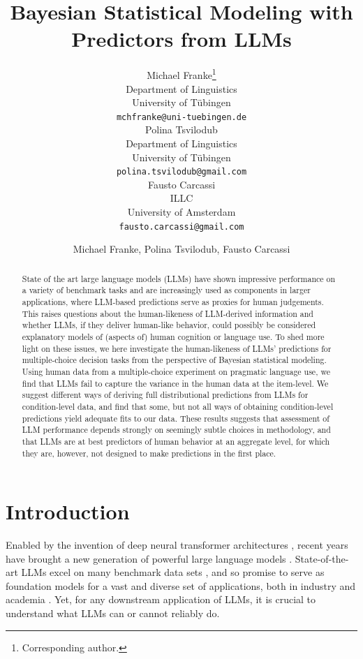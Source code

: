 \documentclass[fleqn]{article}
\title{Bayesian Statistical Modeling with Predictors from LLMs}
\date{}
\author{ Michael Franke\thanks{Corresponding author.} \\
	Department of Linguistics\\
	University of Tübingen\\
	\texttt{mchfranke@uni-tuebingen.de} \\
	\And
	Polina Tsvilodub \\
	Department of Linguistics\\
	University of Tübingen\\
	\texttt{polina.tsvilodub@gmail.com} \\
	\And
	Fausto Carcassi \\
	ILLC\\
	University of Amsterdam\\
	\texttt{fausto.carcassi@gmail.com} \\
}
\author{Michael Franke, Polina Tsvilodub, Fausto Carcassi}
\affil{Department of Linguistics\\University of Tübingen\\
\texttt{[michael.franke|polina.tsvilodub|fausto.carcassi]@uni-tuebingen.de}}
\begin{document}
\maketitle

\begin{abstract}
  State of the art large language models (LLMs) have shown impressive performance on a variety of benchmark tasks and are increasingly used as components in larger applications, where LLM-based predictions serve as proxies for human judgements.
  This raises questions about the human-likeness of LLM-derived information and whether LLMs, if they deliver human-like behavior, could possibly be considered explanatory models of (aspects of) human cognition or language use.
  To shed more light on these issues, we here investigate the human-likeness of LLMs' predictions for multiple-choice decision tasks from the perspective of Bayesian statistical modeling.
  Using human data from a multiple-choice experiment on pragmatic language use, we find that LLMs fail to capture the variance in the human data at the item-level.
  We suggest different ways of deriving full distributional predictions from LLMs for condition-level data, and find that some, but not all ways of obtaining condition-level predictions yield adequate fits to our data.
  These results suggests that assessment of LLM performance depends strongly on seemingly subtle choices in methodology, and that LLMs are at best predictors of human behavior at an aggregate level, for which they are, however, not designed to make predictions in the first place.
\end{abstract}



\section{Introduction}
\label{sec:introduction}

Enabled by the invention of deep neural transformer architectures \citep{VaswaniShazeer2017:Attention-is-Al}, recent years have brought a new generation of powerful large language models  \citep{DevlinChang2019:BERT:-Pre-train,ChungHou2022:Scaling-Instruc,OpenAI2023:GPT-4-Technical,TouvronLavril2023:LLaMA:-Open-and}.
State-of-the-art LLMs excel on many benchmark data sets \citep[e.g.,][]{srivastava2023-BIGbench,PerezRinger2023:Discovering-Lan}, and so promise to serve as foundation models for a vast and diverse set of applications, both in industry and academia \citep{BommasaniHudson2021:On-the-opportun}.
Yet, for any downstream application of LLMs, it is crucial to understand what LLMs can or cannot reliably do.
\end{document}
